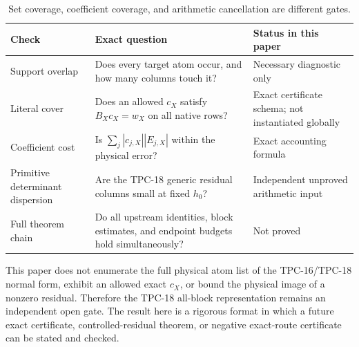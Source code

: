 \begin{table}[ht]
\centering
\small
\begin{tabularx}{\textwidth}{@{}
  >{\raggedright\arraybackslash}p{}
  >{\raggedright\arraybackslash}X
  >{\raggedright\arraybackslash}p{}@{}}
\toprule
Check & Exact question & Status in this paper\\
\midrule
Support overlap
&
Does every target atom occur, and how many columns touch it?
&
Necessary diagnostic only
\\
\addlinespace
Literal cover
&
Does an allowed \(c_X\) satisfy \(B_Xc_X=w_X\) on all native rows?
&
Exact certificate schema; not instantiated globally
\\
\addlinespace
Coefficient cost
&
Is \(\sum_j|c_{j,X}||E_{j,X}|\) within the physical error?
&
Exact accounting formula
\\
\addlinespace
Primitive determinant dispersion
&
Are the TPC-18 generic residual columns small at fixed \(h_0\)?
&
Independent unproved arithmetic input
\\
\addlinespace
Full theorem chain
&
Do all upstream identities, block estimates, and endpoint budgets
hold simultaneously?
&
Not proved
\\
\bottomrule
\end{tabularx}
\caption{Set coverage, coefficient coverage, and arithmetic
cancellation are different gates.}
\label{tab:tpc18-gates}
\end{table}

\begin{remark}
\label{rem:present-tpc18-status}
This paper does not enumerate the full physical atom list of the
TPC-16/TPC-18 normal form, exhibit an allowed exact \(c_X\), or bound
the physical image of a nonzero residual.  Therefore the TPC-18
all-block representation remains an independent open gate.  The
result here is a rigorous format in which a future exact certificate,
controlled-residual theorem, or negative exact-route certificate can
be stated and checked.
\end{remark}
